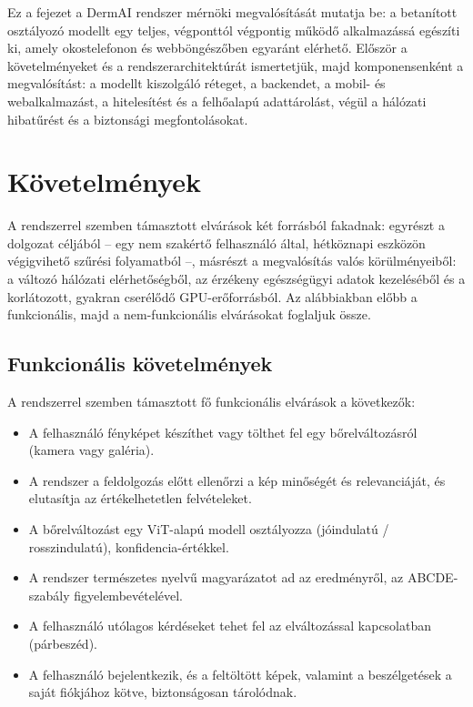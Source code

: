 
Ez a fejezet a DermAI rendszer mérnöki megvalósítását mutatja be: a betanított
osztályozó modellt egy teljes, végponttól végpontig működő alkalmazássá
egészíti ki, amely okostelefonon és webböngészőben egyaránt elérhető. Először a
követelményeket és a rendszerarchitektúrát ismertetjük, majd komponensenként a
megvalósítást: a modellt kiszolgáló réteget, a backendet, a mobil- és
webalkalmazást, a hitelesítést és a felhőalapú adattárolást, végül a hálózati
hibatűrést és a biztonsági megfontolásokat.

\section{Követelmények}

A rendszerrel szemben támasztott elvárások két forrásból fakadnak: egyrészt a
dolgozat céljából -- egy nem szakértő felhasználó által, hétköznapi eszközön
végigvihető szűrési folyamatból --, másrészt a megvalósítás valós
körülményeiből: a változó hálózati elérhetőségből, az érzékeny egészségügyi
adatok kezeléséből és a korlátozott, gyakran cserélődő GPU-erőforrásból. Az
alábbiakban előbb a funkcionális, majd a nem-funkcionális elvárásokat foglaljuk
össze.

\subsection{Funkcionális követelmények}

A rendszerrel szemben támasztott fő funkcionális elvárások a következők:

\begin{itemize}
  \item A felhasználó fényképet készíthet vagy tölthet fel egy
  bőrelváltozásról (kamera vagy galéria).
  \item A rendszer a feldolgozás előtt ellenőrzi a kép minőségét és
  relevanciáját, és elutasítja az értékelhetetlen felvételeket.
  \item A bőrelváltozást egy ViT-alapú modell osztályozza
  (jó\-indulatú / rosszindulatú), konfidencia-értékkel.
  \item A rendszer természetes nyelvű magyarázatot ad az eredményről, az
  ABCDE-szabály figyelembevételével.
  \item A felhasználó utólagos kérdéseket tehet fel az elváltozással
  kapcsolatban (párbeszéd).
  \item A felhasználó bejelentkezik, és a feltöltött képek, valamint a
  beszélgetések a saját fiókjához kötve, biztonságosan tárolódnak.
\end{itemize}

